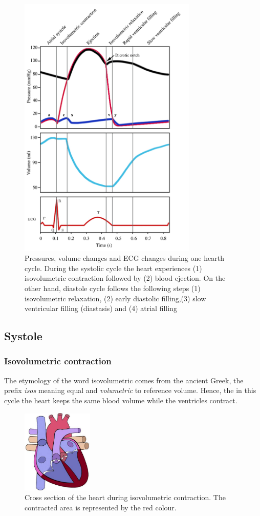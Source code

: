 \begin{figure}[!htpb]
	\centering
	\includegraphics[width=8.5cm,keepaspectratio]{figure_pressure}    
	\caption[Changes of Pressure and Volume in the heart - ECG]{Pressures, volume changes and ECG changes during one hearth cycle. During the systolic cycle the heart experiences (1) isovolumetric contraction followed by (2) blood ejection. On the other hand, diastole cycle follows the following steps (1) isovolumetric relaxation, (2) early diastolic filling,(3) slow ventricular filling (diastasis) and (4) atrial filling \cite{fukuta2008cardiac}}
	\label{fig:heart cycle}
\end{figure}

\subsection{Systole}
\subsubsection{Isovolumetric contraction}
The etymology of the word isovolumetric comes from the ancient Greek, the prefix \textit{isos} meaning equal and \textit{volumetric} to reference volume. Hence, the in this cycle the heart keeps the same blood volume while the ventricles contract.

\begin{figure}[!htpb]
		\centering
		\includegraphics[height=4cm,keepaspectratio]{figure_3}   
		\caption[Heart during isovolumetric contaction]{Cross section of the heart during isovolumetric contraction. The contracted area is represented by the red colour.}
		\label{fig:heart isovolumic}
\end{figure}

